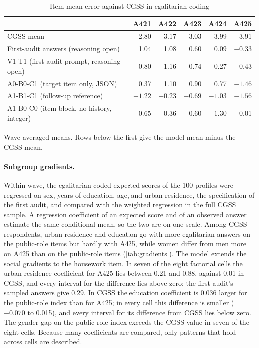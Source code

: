 \documentclass[11pt]{article}
\begin{document}
\begin{table}[H]
\centering
\caption{Item-mean error against CGSS in egalitarian coding}
\label{tab:direction}
\small
\begin{tabular}{lrrrrr}
\toprule
 & A421 & A422 & A423 & A424 & A425 \\
\midrule
CGSS mean & 2.80 & 3.17 & 3.03 & 3.99 & 3.91 \\
First-audit answers (reasoning open) & 1.04 & 1.08 & 0.60 & 0.09 & $-0.33$ \\
V1-T1 (first-audit prompt, reasoning open) & 0.80 & 1.16 & 0.74 & 0.27 & $-0.43$ \\
A0-B0-C1 (target item only, JSON) & 0.37 & 1.10 & 0.90 & 0.77 & $-1.46$ \\
A1-B1-C1 (follow-up reference) & $-1.22$ & $-0.23$ & $-0.69$ & $-1.03$ & $-1.56$ \\
A1-B0-C0 (item block, no history, integer) & $-0.65$ & $-0.36$ & $-0.60$ & $-1.30$ & 0.01 \\
\bottomrule
\end{tabular}
\begin{tablenotes}\footnotesize
\item Wave-averaged means. Rows below the first give the model mean minus the CGSS mean.
\end{tablenotes}
\end{table}

\paragraph{Subgroup gradients.} Within wave, the egalitarian-coded expected scores of the 100 profiles were regressed on sex, years of education, age, and urban residence, the specification of the first audit, and compared with the weighted regression in the full CGSS sample. A regression coefficient of an expected score and of an observed answer estimate the same conditional mean, so the two are on one scale. Among CGSS respondents, urban residence and education go with more egalitarian answers on the public-role items but hardly with A425, while women differ from men more on A425 than on the public-role items (\cref{tab:gradients}). The model extends the social gradients to the housework item. In seven of the eight factorial cells the urban-residence coefficient for A425 lies between 0.21 and 0.88, against 0.01 in CGSS, and every interval for the difference lies above zero; the first audit's sampled answers give 0.29. In CGSS the education coefficient is 0.036 larger for the public-role index than for A425; in every cell this difference is smaller ($-0.070$ to 0.015), and every interval for its difference from CGSS lies below zero. The gender gap on the public-role index exceeds the CGSS value in seven of the eight cells. Because many coefficients are compared, only patterns that hold across cells are described.
\end{document}
